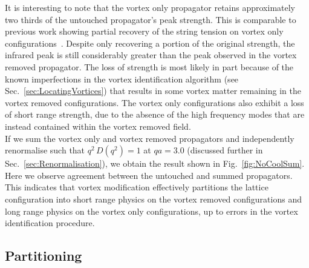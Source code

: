 It is interesting to note that the vortex only propagator retains approximately two thirds of the untouched propagator's peak strength. This is comparable to previous work showing partial recovery of the string tension on vortex only configurations~\cite{Trewartha:2015ida,Trewartha:2017ive,Langfeld:2003ev,Stack:2002sy}. Despite only recovering a portion of the original strength, the infrared peak is still considerably greater than the peak observed in the vortex removed propagator. The loss of strength is most likely in part because of the known imperfections in the vortex identification algorithm (see Sec.~\ref{sec:LocatingVortices}) that results in some vortex matter remaining in the vortex removed configurations. The vortex only configurations also exhibit a loss of short range strength, due to the absence of the high frequency modes that are instead contained within the vortex removed field.\\

If we sum the vortex only and vortex removed propagators and independently renormalise such that $q^2\,D(q^2)=1$ at $qa=3.0$ (discussed further in Sec.~\ref{sec:Renormalisation}), we obtain the result shown in Fig.~\ref{fig:NoCoolSum}. Here we observe agreement between the untouched and summed propagators. This indicates that vortex modification effectively partitions the lattice configuration into short range physics on the vortex removed configurations and long range physics on the vortex only configurations, up to errors in the vortex identification procedure.

\subsection{Partitioning}

